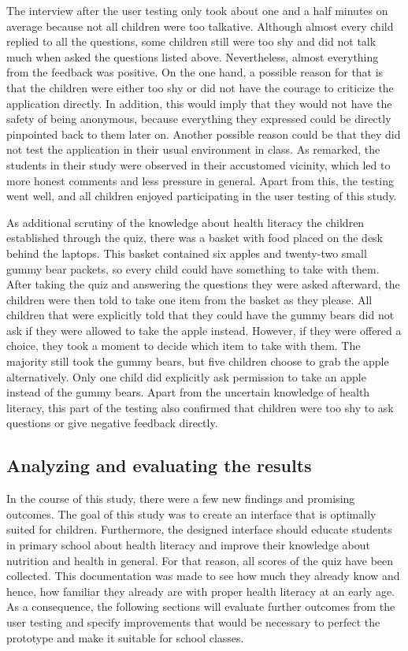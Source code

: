 The interview after the user testing only took about one and a half minutes on average because not all children were too talkative. Although almost every child replied to all the questions, some children still were too shy and did not talk much when asked the questions listed above. Nevertheless, almost everything from the feedback was positive. On the one hand, a possible reason for that is that the children were either too shy or did not have the courage to criticize the application directly. In addition, this would imply that they would not have the safety of being anonymous, because everything they expressed could be directly pinpointed back to them later on. Another possible reason could be that they did not test the application in their usual environment in class. As \textcite{walker2000screen} remarked, the students in their study were observed in their accustomed vicinity, which led to more honest comments and less pressure in general. 
Apart from this, the testing went well, and all children enjoyed participating in the user testing of this study.

As additional scrutiny of the knowledge about health literacy the children established through the quiz, there was a basket with food placed on the desk behind the laptops. This basket contained six apples and twenty-two small gummy bear packets, so every child could have something to take with them. After taking the quiz and answering the questions they were asked afterward, the children were then told to take one item from the basket as they please.
All children that were explicitly told that they could have the gummy bears did not ask if they were allowed to take the apple instead. However, if they were offered a choice, they took a moment to decide which item to take with them. The majority still took the gummy bears, but five children choose to grab the apple alternatively. Only one child did explicitly ask permission to take an apple instead of the gummy bears. Apart from the uncertain knowledge of health literacy, this part of the testing also confirmed that children were too shy to ask questions or give negative feedback directly.

\subsection{Analyzing and evaluating the results}
\label{subsection:AnalyzingResults}
In the course of this study, there were a few new findings and promising outcomes. 
The goal of this study was to create an interface that is optimally suited for children. Furthermore, the designed interface should educate students in primary school about health literacy and improve their knowledge about nutrition and health in general. For that reason, all scores of the quiz have been collected. This documentation was made to see how much they already know and hence, how familiar they already are with proper health literacy at an early age.\\
As a consequence, the following sections will evaluate further outcomes from the user testing and specify improvements that would be necessary to perfect the prototype and make it suitable for school classes.

